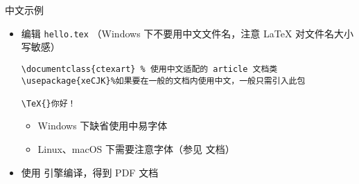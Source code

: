\begin{frame}[fragile]{中文示例}
  
    \begin{itemize}
        \item 编辑 \texttt{hello.tex} （Windows 下不要用中文文件名，注意
        \LaTeX{} 对文件名大小写敏感）
        \lstset{language=[LaTeX]TeX}
        \begin{lstlisting}[basicstyle=\ttfamily]
\documentclass{ctexart} % 使用中文适配的 article 文档类
\usepackage{xeCJK}%如果要在一般的文档内使用中文，一般只需引入此包

\TeX{}你好！

        \end{lstlisting}
        \pause
        
        \begin{itemize}
          \item Windows 下缺省使用中易字体
          \item Linux、macOS 下需要注意字体（参见  文档）
        \end{itemize}
          \item 使用 \XeLaTeX{} 引擎编译，得到 PDF 文档
        \begin{center}
        \end{center}
    \end{itemize}
\end{frame}
  

